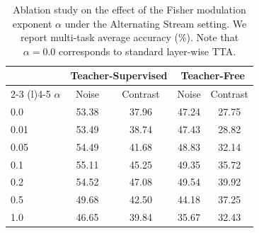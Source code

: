 \begin{table}[h]
\caption{Ablation study on the effect of the Fisher modulation exponent $\alpha$ under the Alternating Stream setting. We report multi-task average accuracy (\%). Note that $\alpha = 0.0$ corresponds to standard layer-wise TTA.}
\label{tab:ablation_alpha}
\vskip 0.05in
\begin{center}
\begin{scriptsize}
\begin{sc}
\begin{tabular}{lcccc}
\toprule
& \multicolumn{2}{c}{\textbf{Teacher-Supervised}} & \multicolumn{2}{c}{\textbf{Teacher-Free}} \\
\cmidrule(r){2-3} \cmidrule(l){4-5}
$\alpha$ & Noise & Contrast & Noise & Contrast \\
\midrule
0.0   & 53.38 & 37.96 & 47.24 & 27.75 \\
0.01  & 53.49 & 38.74 & 47.43 & 28.82 \\
0.05  & 54.49 & 41.68 & 48.83 & 32.14 \\
0.1   & 55.11 & 45.25 & 49.35 & 35.72 \\
0.2   & 54.52 & 47.08 & 49.54 & 39.92 \\
0.5   & 49.68 & 42.50 & 44.18 & 37.25 \\
1.0   & 46.65 & 39.84 & 35.67 & 32.43 \\
\bottomrule
\end{tabular}
\end{sc}
\end{scriptsize}
\end{center}
\vskip -0.15in
\end{table}
